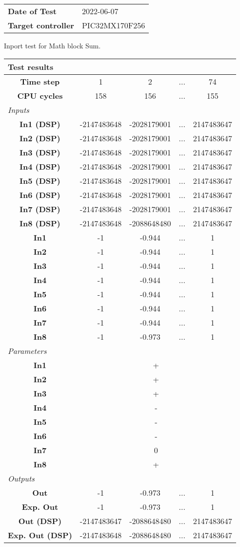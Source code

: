 \begin{tabular}{l l}
\textbf{Date of Test} & 2022-06-07 \tabularnewline
\textbf{Target controller} & PIC32MX170F256 \tabularnewline
\end{tabular}
\vspace{1ex}
Inport test for Math block Sum.

\vspace{1em}
\begin{tabularx}{\textwidth}{|c|c|c|>{\centering\arraybackslash}X|c|}
\hline
\multicolumn{5}{|l|}{\cellcolor[gray]{0.8}\textbf{Test results}} \tabularnewline \hline
\textbf{Time step} & 1 & 2 & ... & 74 \tabularnewline \hline
\textbf{CPU cycles} & 158 & 156 & ... & 155 \tabularnewline \hline
\multicolumn{5}{|l|}{\cellcolor[gray]{0.9}\textit{Inputs}} \tabularnewline \hline
\textbf{In1 (DSP)} & -2147483648 & -2028179001 & ... & 2147483647 \tabularnewline \hline
\textbf{In2 (DSP)} & -2147483648 & -2028179001 & ... & 2147483647 \tabularnewline \hline
\textbf{In3 (DSP)} & -2147483648 & -2028179001 & ... & 2147483647 \tabularnewline \hline
\textbf{In4 (DSP)} & -2147483648 & -2028179001 & ... & 2147483647 \tabularnewline \hline
\textbf{In5 (DSP)} & -2147483648 & -2028179001 & ... & 2147483647 \tabularnewline \hline
\textbf{In6 (DSP)} & -2147483648 & -2028179001 & ... & 2147483647 \tabularnewline \hline
\textbf{In7 (DSP)} & -2147483648 & -2028179001 & ... & 2147483647 \tabularnewline \hline
\textbf{In8 (DSP)} & -2147483648 & -2088648480 & ... & 2147483647 \tabularnewline \hline
\textbf{In1} & -1 & -0.944 & ... & 1 \tabularnewline \hline
\textbf{In2} & -1 & -0.944 & ... & 1 \tabularnewline \hline
\textbf{In3} & -1 & -0.944 & ... & 1 \tabularnewline \hline
\textbf{In4} & -1 & -0.944 & ... & 1 \tabularnewline \hline
\textbf{In5} & -1 & -0.944 & ... & 1 \tabularnewline \hline
\textbf{In6} & -1 & -0.944 & ... & 1 \tabularnewline \hline
\textbf{In7} & -1 & -0.944 & ... & 1 \tabularnewline \hline
\textbf{In8} & -1 & -0.973 & ... & 1 \tabularnewline \hline
\multicolumn{5}{|l|}{\cellcolor[gray]{0.9}\textit{Parameters}} \tabularnewline \hline
\textbf{In1} & \multicolumn{4}{c|}{+} \tabularnewline \hline
\textbf{In2} & \multicolumn{4}{c|}{+} \tabularnewline \hline
\textbf{In3} & \multicolumn{4}{c|}{+} \tabularnewline \hline
\textbf{In4} & \multicolumn{4}{c|}{-} \tabularnewline \hline
\textbf{In5} & \multicolumn{4}{c|}{-} \tabularnewline \hline
\textbf{In6} & \multicolumn{4}{c|}{-} \tabularnewline \hline
\textbf{In7} & \multicolumn{4}{c|}{0} \tabularnewline \hline
\textbf{In8} & \multicolumn{4}{c|}{+} \tabularnewline \hline
\multicolumn{5}{|l|}{\cellcolor[gray]{0.9}\textit{Outputs}} \tabularnewline \hline
\textbf{Out} & -1 & -0.973 & ... & 1 \tabularnewline \hline
\textbf{Exp. Out} & -1 & -0.973 & ... & 1 \tabularnewline \hline
\textbf{Out (DSP)} & -2147483647 & -2088648480 & ... & 2147483647 \tabularnewline \hline
\textbf{Exp. Out (DSP)} & -2147483648 & -2088648480 & ... & 2147483647 \tabularnewline \hline
\end{tabularx}
\vspace{1ex}

